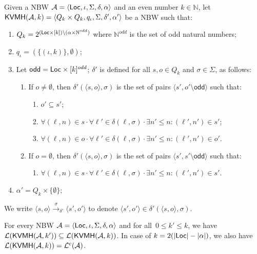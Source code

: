 \documentclass{LMCS}
\def\abs#1{\ensuremath{\lvert #1\rvert}}
\newcommand{\nat}{\mathbb N}
\renewcommand{\l}{{\ell}}
\newcommand{\Loc}{{\sf Loc}}
\newcommand{\tuple}[1]{\langle #1 \rangle}
\newcommand{\A}{\mathcal{A}}
\renewcommand{\L}{\mathcal{L}}
\newcommand{\odd}{\mathsf{odd}}
\newcommand{\KVMH}{{\sf KVMH}}
\begin{document}
\begin{defi}\label{def:direct-complementation}
Given a NBW $\A = \tuple{\Loc, \iota, \Sigma, \delta, \alpha}$ 
and an even number $k \in \nat$, let 
$\KVMH(\A,k) = \tuple{Q_k \times Q_k, q_{\iota}, \Sigma, \delta', \alpha'}$ be a NBW such that:
\begin{enumerate}[$\bullet$] 
\item $Q_k = 2^{(\Loc \times [k]) \setminus (\alpha \times \nat^{odd})}$ where
$\nat^{odd}$ is the set of odd natural numbers;
\item $q_{\iota} = (\{(\iota, k)\}, \emptyset)$;
\item Let $\odd = \Loc \times [k]^{odd}$; $\delta'$ is defined for all $s,o \in Q_k$ and 
$\sigma \in \Sigma$, as follows:
\begin{enumerate}[$-$] 
\item If $o \neq \emptyset$, then $\delta'(\tuple{s,o},\sigma)$ is the set of pairs $\tuple{s',o'\setminus \odd}$ such that:
	\begin{enumerate}[$(i)$] 
	\item $o'\subseteq s'$; 
	\item $\forall (\l,n) \in s \cdot \forall \l' \in \delta(\l,\sigma)\cdot \exists n' \leq n: (\l',n') \in s'$;
\item $\forall (\l,n) \in o \cdot \forall \l' \in \delta(\l,\sigma)\cdot \exists n' \leq n: (\l',n') \in o'$.
\end{enumerate}
\item If $o= \emptyset$, then $\delta'(\tuple{s,o},\sigma)$ is the set of pairs $\tuple{s',s'\setminus \odd}$ such that:
	\begin{enumerate}[$(i)$]
	\item[] $\forall (\l,n) \in s \cdot \forall \l' \in \delta(\l,\sigma)\cdot \exists n' \leq n: (\l',n') \in s'$.
	\end{enumerate}
\end{enumerate} 
\item $\alpha' = Q_k \times \{\emptyset\}$;
\end{enumerate} 
\end{defi}

 We write $\tuple{s,o} \xrightarrow{\sigma}_{\delta'} \tuple{s',o'}$ to 
denote $\tuple{s',o'} \in \delta'(\tuple{s,o},\sigma)$.

\begin{thm}\label{theo:direct-complement}
For every NBW $\A = \tuple{\Loc, \iota, \Sigma, \delta, \alpha}$ and
for all $\,0\leq k' \leq k$, we have $\L(\KVMH(\A,k')) \subseteq
\L(\KVMH(\A,k))$.  In case of $k = 2(\abs{\Loc} - \abs{\alpha})$, we
also have $\L(\KVMH(\A,k)) = \L^c(\A)$.
\end{thm}
\end{document}
